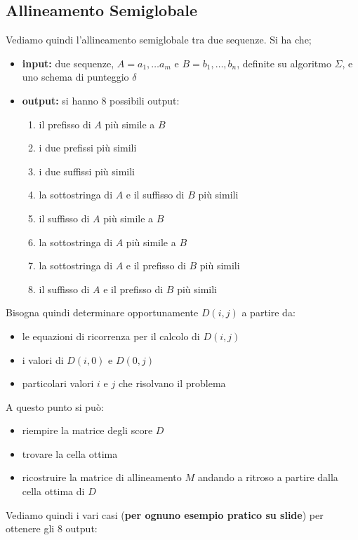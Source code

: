 \documentclass[a4paper,12pt, oneside]{book}
\begin{document}
\subsection{Allineamento Semiglobale}
Vediamo quindi l'allineamento semiglobale tra due sequenze. Si ha che;
\begin{itemize}
  \item \textbf{input:} due sequenze, $A=a_1,\ldots a_m$ e $B=b_1,\ldots,b_n$,
  definite su algoritmo $\Sigma$, e uno schema di punteggio $\delta$
  \item \textbf{output:} si hanno 8 possibili output:
  \begin{enumerate}
    \item il prefisso di $A$ più simile a $B$
    \item i due prefissi più simili
    \item i due suffissi più simili
    \item la sottostringa di $A$ e il suffisso di $B$ più simili
    \item il suffisso di $A$ più simile a $B$
    \item la sottostringa di $A$ più simile a $B$
    \item la sottostringa di $A$ e il prefisso di $B$ più simili
    \item il suffisso di $A$ e il prefisso di $B$ più simili
  \end{enumerate}
\end{itemize}
Bisogna quindi determinare opportunamente $D(i,j)$ a partire da:
\begin{itemize}
  \item le equazioni di ricorrenza per il calcolo di $D(i,j)$
  \item i valori di $D(i,0)$ e $D(0,j)$
  \item particolari valori $i$ e $j$ che risolvano il problema
\end{itemize}
A questo punto si può:
\begin{itemize}
  \item riempire la matrice degli score $D$
  \item trovare la cella ottima
  \item ricostruire la matrice di allineamento $M$ andando a ritroso a partire
  dalla cella ottima di $D$
\end{itemize}
Vediamo quindi i vari casi (\textbf{per ognuno esempio pratico su slide}) per
ottenere gli 8 output:
\end{document}
